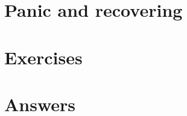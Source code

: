 \section{Panic and recovering}
\label{sec:panic}
\todo{}

\section{Exercises}












\cleardoublepage
\section{Answers}
\shipoutAnswer
